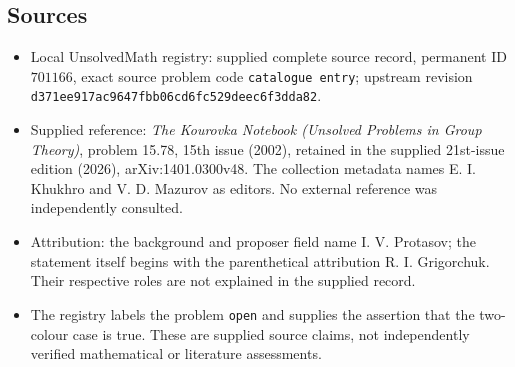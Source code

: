 \documentclass[11pt]{article}
\begin{document}
\subsection{Sources}
\begin{itemize}
\item Local UnsolvedMath registry: supplied complete source record, permanent ID \(701166\), exact source problem code \texttt{catalogue entry}; upstream revision \texttt{d371ee917ac9647fbb06cd6fc529deec6f3dda82}.
\item Supplied reference: \emph{The Kourovka Notebook (Unsolved Problems in Group Theory)}, problem 15.78, 15th issue (2002), retained in the supplied 21st-issue edition (2026), arXiv:1401.0300v48. The collection metadata names E. I. Khukhro and V. D. Mazurov as editors. No external reference was independently consulted.
\item Attribution: the background and proposer field name I. V. Protasov; the statement itself begins with the parenthetical attribution R. I. Grigorchuk. Their respective roles are not explained in the supplied record.
\item The registry labels the problem \texttt{open} and supplies the assertion that the two-colour case is true. These are supplied source claims, not independently verified mathematical or literature assessments.
\end{itemize}
\end{document}

